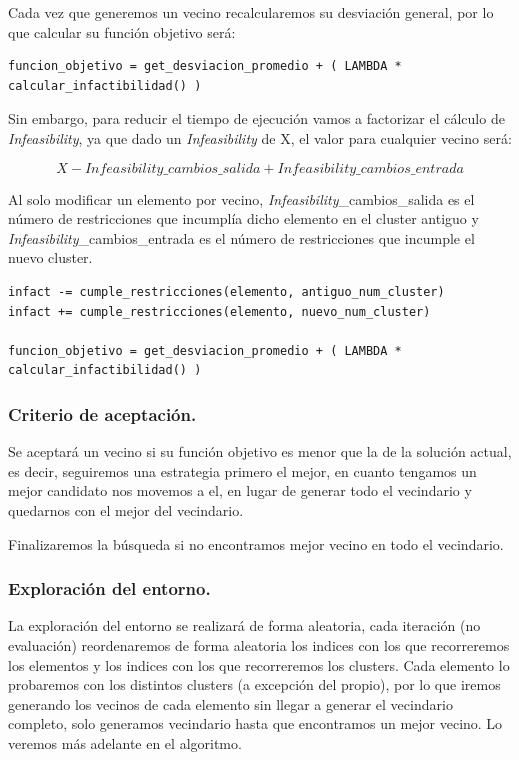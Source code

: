 \documentclass[12pt, spanish]{article}
\begin{document}
Cada vez que generemos un vecino recalcularemos su desviación general, por lo que calcular su función objetivo será:

\begin{lstlisting}
funcion_objetivo = get_desviacion_promedio + ( LAMBDA * calcular_infactibilidad() )
 \end{lstlisting}


Sin embargo, para reducir el tiempo de ejecución vamos a factorizar el cálculo de \textit{Infeasibility}, ya que dado un \textit{Infeasibility} de X, el valor para cualquier vecino será:

$$X - \textit{Infeasibility}\_cambios\_salida + \textit{Infeasibility}\_cambios\_entrada$$
 
 Al solo modificar un elemento por vecino, \textit{Infeasibility}\_cambios\_salida  es el número de restricciones que incumplía dicho elemento en el cluster antiguo y \textit{Infeasibility}\_cambios\_entrada es el número de restricciones que incumple el nuevo cluster.
 
 
 
\begin{lstlisting}
infact -= cumple_restricciones(elemento, antiguo_num_cluster)
infact += cumple_restricciones(elemento, nuevo_num_cluster)

funcion_objetivo = get_desviacion_promedio + ( LAMBDA * calcular_infactibilidad() )
 \end{lstlisting}

\subsubsection{Criterio de aceptación.}

Se aceptará un vecino si su función objetivo es menor que la de la solución actual, es decir, seguiremos una estrategia primero el mejor, en cuanto tengamos un mejor candidato nos movemos a el, en lugar de generar todo el vecindario y quedarnos con el mejor del vecindario.

Finalizaremos la búsqueda si no encontramos mejor vecino en todo el vecindario.

\subsubsection{Exploración del entorno.}

La exploración del entorno se realizará de forma aleatoria, cada iteración (no evaluación) reordenaremos de forma aleatoria los indices con los que recorreremos los elementos y los indices con los que recorreremos los clusters. Cada elemento lo probaremos con los distintos clusters (a excepción del propio), por lo que iremos generando los vecinos de cada elemento sin llegar a generar el vecindario completo, solo generamos vecindario hasta que encontramos un mejor vecino. Lo veremos más adelante en el algoritmo.
\end{document}

